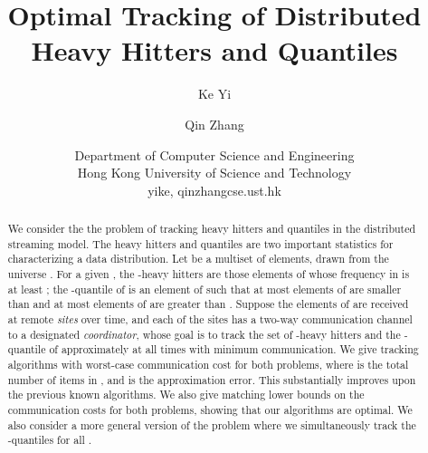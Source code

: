 \documentclass[10pt]{article}
\title{Optimal Tracking of Distributed Heavy Hitters and Quantiles}
\author{Ke Yi \and Qin Zhang}
\date{Department of Computer Science and Engineering \\
Hong Kong University of Science and Technology \\
yike, qinzhangcse.ust.hk}
\begin{document}
\maketitle

\begin{abstract}
  We consider the the problem of tracking heavy hitters and quantiles in
  the distributed streaming model.  The heavy hitters and quantiles are two
  important statistics for characterizing a data distribution.  Let  be
  a multiset of elements, drawn from the universe .  For a
  given , the -heavy hitters are those elements of
   whose frequency in  is at least ; the -quantile of
   is an element  of  such that at most  elements of 
  are smaller than  and at most  elements of  are
  greater than .  Suppose the elements of  are received at  remote
  {\em sites} over time, and each of the sites has a two-way communication
  channel to a designated {\em coordinator}, whose goal is to track the set
  of -heavy hitters and the -quantile of  approximately at
  all times with minimum communication.  We give tracking algorithms with
  worst-case communication cost  for both problems,
  where  is the total number of items in , and  is the
  approximation error.  This substantially improves upon the previous known
  algorithms.  We also give matching lower bounds on the communication
  costs for both problems, showing that our algorithms are optimal.  We
  also consider a more general version of the problem where we
  simultaneously track the -quantiles for all .
\end{abstract}
\end{document}
